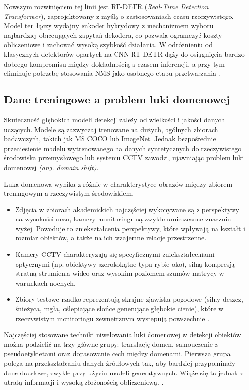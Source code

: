 Nowszym rozwinięciem tej linii jest RT-DETR (\textit{Real-Time Detection Transformer}),
zaprojektowany z myślą o zastosowaniach czasu rzeczywistego. Model ten łączy wydajny enkoder
hybrydowy z mechanizmem wyboru najbardziej obiecujących zapytań dekodera, co pozwala ograniczyć
koszty obliczeniowe i zachować wysoką szybkość działania. W odróżnieniu od klasycznych detektorów
opartych na CNN RT-DETR dąży do osiągnięcia bardzo dobrego kompromisu między dokładnością a czasem
inferencji, a przy tym eliminuje potrzebę stosowania NMS jako osobnego etapu przetwarzania
\cite{zhao2024detrs}.

\subsection{Dane treningowe a problem luki domenowej}

Skuteczność głębokich modeli detekcji zależy od wielkości i jakości danych uczących. Modele są
zazwyczaj trenowane na dużych, ogólnych zbiorach badawczych, takich jak MS COCO lub ImageNet.
Jednak bezpośrednie przeniesienie modelu wytrenowanego na danych syntetycznych do rzeczywistego
środowiska przemysłowego lub systemu CCTV zawodzi, ujawniając problem luki domenowej \textit{(ang.
  domain shift)}\cite{he2024}.

Luka domenowa wynika z różnic w charakterystyce obrazów między zbiorem treningowym a rzeczywistym
środowiskiem.
\begin{itemize}
  \item Zdjęcia w zbiorach akademickich najczęściej wykonywane są z perspektywy na wysokości oczu, kamery
        monitoringu są zwykle umieszczone znacznie wyżej. Powoduje to zniekształcenia perspektywy, które
        wpływają na kształt i rozmiar obiektów, a także na ich wzajemne relacje przestrzenne.
  \item Kamery CCTV charakteryzują się specyficznymi zniekształceniami optycznymi (np. obiektywy
        szerokokątne typu rybie oko), silną kompresją stratną strumienia wideo oraz wysokim poziomem szumów
        matrycy w warunkach nocnych.
  \item Zbiory testowe rzadko reprezentują skrajne zjawiska pogodowe (silny deszcz, śnieżyca, mgła,
        oślepiające słońce generujące głębokie cienie), które w rzeczywistym monitoringu zewnętrznym
        występują powszechnie \cite{he2024}.
\end{itemize}

Najczęściej stosowane techniki niwelowania luki domenowej w detekcji obiektów można podzielić na
trzy główne grupy: translację domen, samouczenie z pseudoetykietami oraz dopasowanie cech między
domenami. Pierwsza grupa polega na przekształcaniu danych źródłowych tak, aby bardziej przypominały
dane docelowe, zwykle przy użyciu modeli generatywnych. Wiąże się to jednak z utratą informacji i
wysoką złożonością obliczeniową. \cite{he2024}.

